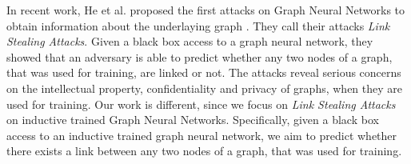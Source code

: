   In recent work, He et al. proposed the first attacks on Graph Neural Networks to obtain information about the underlaying graph \cite{DBLP:journals/corr/abs-2005-02131}.
  They call their attacks \emph{Link Stealing Attacks}.
  Given a black box access to a graph neural network, they showed that an adversary is able to predict whether any two nodes of a graph, that was used for training, are linked or not.
  The attacks reveal serious concerns on the intellectual property, confidentiality and privacy of graphs, when they are used for training.
  Our work is different, since we focus on \emph{Link Stealing Attacks} on inductive trained Graph Neural Networks.
  Specifically, given a black box access to an inductive trained graph neural network, we aim to predict whether there exists a link between any two nodes of a graph, that was used for training.

